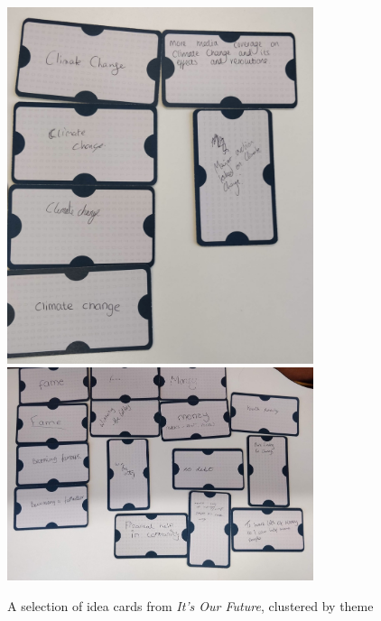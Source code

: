 \begin{figure}
    \centering
\includegraphics[width=0.8\textwidth]{Images/7/idea-cards-climate.jpeg}
\includegraphics[width=0.8\textwidth]{Images/7/idea-cards-money.jpeg}
  \caption{A selection of idea cards from \textit{It's Our Future}, clustered by theme}
    \label{fig:idea-cards-eg}
\end{figure}

